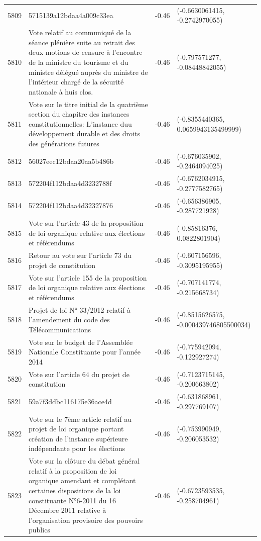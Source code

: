 \begin{table}[ht]
\begin{tabular}{rlrl}
  5809 & 5715139a12bdaa4a009c33ea & -0.46 & (-0.6630061415, -0.2742970055) \\ 
  5810 & Vote relatif au communiqué de la séance plénière suite au retrait des deux motions de censure à l'encontre de la ministre du tourisme et du ministre délégué auprès du ministre de l'intérieur chargé de la sécurité nationale à huis clos. & -0.46 & (-0.797571277, -0.08448842055) \\ 
  5811 & Vote sur le titre initial de la quatrième section du chapitre des instances constitutionnelles: L'instance duu développement durable et des droits des générations futures & -0.46 & (-0.8355440365, 0.0659943135499999) \\ 
  5812 & 56027eec12bdaa20aa5b486b & -0.46 & (-0.676035902, -0.2464094025) \\ 
  5813 & 572204f112bdaa4d3232788f & -0.46 & (-0.6762034915, -0.2777582765) \\ 
  5814 & 572204f112bdaa4d32327876 & -0.46 & (-0.656386905, -0.287721928) \\ 
  5815 & Vote sur l'article 43 de la proposition de loi organique relative aux élections et référendums & -0.46 & (-0.85816376, 0.0822801904) \\ 
  5816 & Retour au vote sur l'article 73 du projet de constitution & -0.46 & (-0.607156596, -0.3095195955) \\ 
  5817 & Vote sur l'article 155 de la proposition de loi organique relative aux élections et référendums & -0.46 & (-0.707141774, -0.215668734) \\ 
  5818 & Projet de loi N° 33/2012 relatif à l'amendement du code des Télécommunications & -0.46 & (-0.8515626575, -0.000439746805500034) \\ 
  5819 & Vote sur le budget de l'Assemblée Nationale Constituante pour l'année 2014 & -0.46 & (-0.775942094, -0.122927274) \\ 
  5820 & Vote sur l'article 64 du projet de constitution & -0.46 & (-0.7123715145, -0.200663802) \\ 
  5821 & 59a7f3ddbc116175e36ace4d & -0.46 & (-0.631868961, -0.297769107) \\ 
  5822 & Vote sur le 7ème article relatif au projet de loi organique portant création de l'instance supérieure indépendante pour les élections & -0.46 & (-0.753990949, -0.206053532) \\ 
  5823 & Vote sur la clôture du débat général relatif à la proposition de loi organique amendant et complétant certaines dispositions de la loi constituante N°6-2011 du 16 Décembre 2011 relative à l'organisation provisoire des pouvoirs publics & -0.46 & (-0.6723593535, -0.258704961) \\ 

\end{tabular}
\end{table}
